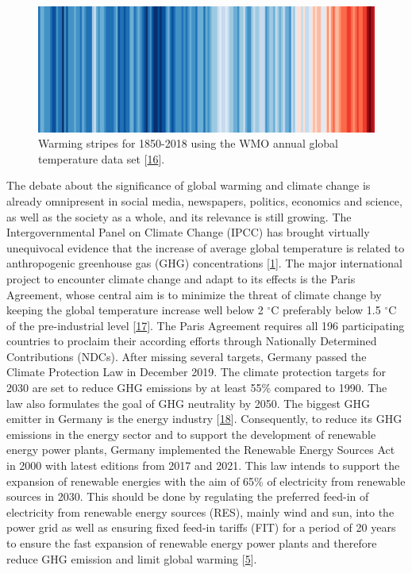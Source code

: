 \documentclass[a4paper,11pt]{article}
\begin{document}
\begin{figure}

{\centering \includegraphics[width=1\linewidth,height=0.07\textheight]{figures/wmo_stripes} 

}

\caption{Warming stripes for 1850-2018 using the WMO annual global temperature data set {[}\protect\hyperlink{ref-EdHawkins.2018}{16}{]}.}\label{fig:wmo}
\end{figure}
The debate about the significance of global warming and climate change is already omnipresent in social media, newspapers, politics, economics and science, as well as the society as a whole, and its relevance is still growing. The Intergovernmental Panel on Climate Change (IPCC) has brought virtually unequivocal evidence that the increase of average global temperature is related to anthropogenic greenhouse gas (GHG) concentrations
{[}\protect\hyperlink{ref-IntergovernmentalPanelonClimateChange.2014}{1}{]}. The major international project to encounter climate change and adapt to its effects is the Paris Agreement, whose central aim is to minimize the threat of climate
change by keeping the global temperature increase well below 2 \(^\circ\)C preferably below 1.5 \(^\circ\)C of the pre-industrial level {[}\protect\hyperlink{ref-UnitedNations.2015}{17}{]}. The Paris Agreement requires all 196 participating countries to proclaim their according efforts through Nationally Determined Contributions (NDCs). After missing several targets, Germany passed the Climate Protection Law in December 2019. The climate protection targets for 2030 are set to reduce GHG emissions by at least 55\% compared to 1990. The law also formulates the goal of GHG neutrality by 2050. The biggest GHG emitter in Germany is the energy industry {[}\protect\hyperlink{ref-Umweltbundesamt.2018}{18}{]}. Consequently, to reduce its GHG emissions in the energy sector and to support the development of renewable energy power plants, Germany implemented the Renewable Energy Sources Act in 2000 with latest editions from 2017 and 2021. This law intends to support the expansion of renewable energies with the aim of 65\% of electricity from renewable sources in 2030. This should be done by regulating the preferred feed-in of electricity from renewable energy sources (RES), mainly wind and sun, into the power grid as well as ensuring fixed feed-in tariffs (FIT) for a period of 20 years to ensure the fast expansion of renewable energy power plants and therefore reduce GHG emission and limit global warming {[}\protect\hyperlink{ref-BundesamtfurJustiz.2021}{5}{]}.
\end{document}
